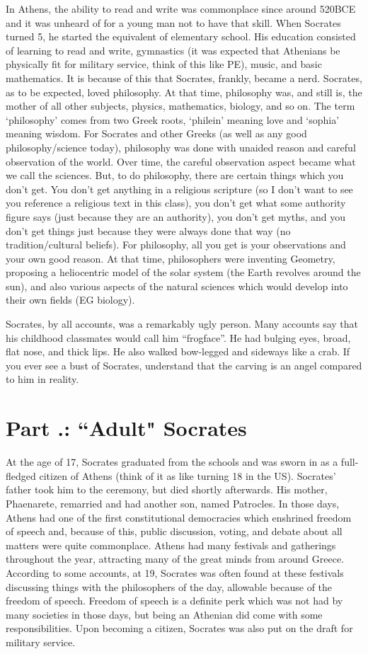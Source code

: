In Athens, the ability to read and write was commonplace since around 520BCE and it was unheard of for a young man not to have that skill. When Socrates turned 5, he started the equivalent of elementary school. His education consisted of learning to read and write, gymnastics (it was expected that Athenians be physically fit for military service, think of this like PE), music, and basic mathematics. It is because of this that Socrates, frankly, became a nerd. Socrates, as to be expected, loved philosophy. At that time, philosophy was, and still is, the mother of all other subjects, physics, mathematics, biology, and so on. The term `philosophy' comes from two Greek roots, `philein' meaning love and `sophia' meaning wisdom. For Socrates and other Greeks (as well as any good philosophy/science today), philosophy was done with unaided reason and careful observation of the world. Over time, the careful observation aspect became what we call the sciences. But, to do philosophy, there are certain things which you don't get. You don't get anything in a religious scripture (so I don't want to see you reference a religious text in this class), you don't get what some authority figure says (just because they are an authority), you don't get myths, and you don't get things just because they were always done that way (no tradition/cultural beliefs). For philosophy, all you get is your observations and your own good reason. At that time, philosophers were inventing Geometry, proposing a heliocentric model of the solar system (the Earth revolves around the sun), and also various aspects of the natural sciences which would develop into their own fields (EG biology).

Socrates, by all accounts, was a remarkably ugly person. Many accounts say that his childhood classmates would call him “frogface”. He had bulging eyes, broad, flat nose, and thick lips. He also walked bow-legged and sideways like a crab. If you ever see a bust of Socrates, understand that the carving is an angel compared to him in reality.
\section{Part \thechapcount.\theseccount: “Adult" Socrates}

At the age of 17, Socrates graduated from the schools and was sworn in as a full-fledged citizen of Athens (think of it as like turning 18 in the US). Socrates' father took him to the ceremony, but died shortly afterwards. His mother, Phaenarete, remarried and had another son, named Patrocles.  In those days, Athens had one of the first constitutional democracies which enshrined freedom of speech and, because of this, public discussion, voting, and debate about all matters were quite commonplace. Athens had many festivals and gatherings throughout the year, attracting many of the great minds from around Greece. According to some accounts, at 19, Socrates was often found at these festivals discussing things with the philosophers of the day, allowable because of the freedom of speech. Freedom of speech is a definite perk which was not had by many societies in those days, but being an Athenian did come with some responsibilities. Upon becoming a citizen, Socrates was also put on the draft for military service.
